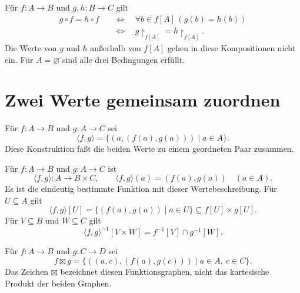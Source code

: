 \begin{theorem}
\label{b05guide:thm:composition-equality}
Für $f\colon A\to B$ und $g,h\colon B\to C$ gilt
\[
 \begin{aligned}
 g\circ f=h\circ f
 &\quad\Longleftrightarrow\quad
       \forall b\in f[A]\,(g(b)=h(b))\\
 &\quad\Longleftrightarrow\quad
       g\restriction_{f[A]}=h\restriction_{f[A]}.
 \end{aligned}
\]
Die Werte von $g$ und $h$ außerhalb von $f[A]$ gehen
in diese Kompositionen nicht ein. Für $A=\varnothing$
sind alle drei Bedingungen erfüllt.
\end{theorem}

\section{Zwei Werte gemeinsam zuordnen}

\begin{definition}
\label{b05guide:def:paired-function}
Für $f\colon A\to B$ und $g\colon A\to C$ sei
\[
 \langle f,g\rangle
   =\{(a,(f(a),g(a)))\mid a\in A\}.
\]
Diese Konstruktion faßt die beiden Werte zu einem
geordneten Paar zusammen.
\end{definition}

\begin{theorem}
\label{b05guide:thm:paired-function}
Für $f\colon A\to B$ und $g\colon A\to C$ ist
\[
 \langle f,g\rangle\colon A\to B\times C,\qquad
 \langle f,g\rangle(a)=(f(a),g(a))\quad(a\in A).
\]
Es ist die eindeutig bestimmte Funktion mit dieser
Wertebeschreibung. Für $U\subseteq A$ gilt
\[
 \langle f,g\rangle[U]
   =\{(f(a),g(a))\mid a\in U\}
   \subseteq f[U]\times g[U].
\]
Für $V\subseteq B$ und $W\subseteq C$ gilt
\[
 \langle f,g\rangle^{-1}[V\times W]
      =f^{-1}[V]\cap g^{-1}[W].
\]
\end{theorem}

\begin{definition}[Produktfunktion]
\label{b05guide:def:product-function}
Für $f\colon A\to B$ und $g\colon C\to D$ sei
\[
 f\boxtimes g
  =\{((a,c),(f(a),g(c)))\mid a\in A,\ c\in C\}.
\]
Das Zeichen $\boxtimes$ bezeichnet diesen Funktionsgraphen,
nicht das kartesische Produkt der beiden Graphen.
\end{definition}

